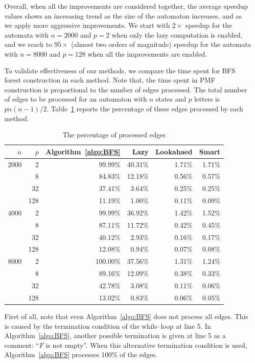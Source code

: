 \documentclass[12pt]{article}
\begin{document}
Overall, when all the improvements are considered together, the average speedup values shows an increasing trend as the size of the automaton increases, and as we apply more aggressive improvements. We start with $2\times$ speedup for the automata with $n=2000$ and $p=2$ when only the lazy computation is enabled, and we reach to $95\times$ (almost two orders of magnitude) speedup for the automata with $n=8000$ and $p=128$ when all the improvements are enabled.

To validate effectiveness of our methods, we compare the time spent for BFS forest construction in each method. Note that, the time spent in PMF construction is proportional to the number of edges processed. The total number of edges to be processed for an automaton with $n$ states and $p$ letters is $pn(n-1)/2$. Table~\ref{table:edge-percent} reports the percentage of these edges processed by each method.

\begin{table}[ht]
	\center
	\begin{tabular}{rr||r||rrr}
$n$		&	$p$	& Algorithm~\ref{algo:BFS} 	& Lazy		& Lookahaed & Smart \\\hline\hline
2000	& 2		& 99.99\%					& 40.31\%	& 1.71\%	& 1.71\%\\
		& 8		& 84.83\%					& 12.18\%	& 0.56\%	& 0.57\%\\
		& 32	& 37.41\%					& 3.64\%	& 0.25\%	& 0.25\%\\
		& 128	& 11.19\%					& 1.00\%	& 0.11\%	& 0.09\%\\\hline
4000	& 2		& 99.99\%					& 36.92\%	& 1.42\%	& 1.52\%\\
		& 8		& 87.11\%					& 11.72\%	& 0.42\%	& 0.45\%\\
		& 32	& 40.12\%					& 2.93\%	& 0.16\%	& 0.17\%\\
		& 128	& 12.08\%					& 0.94\%	& 0.07\%	& 0.08\%\\\hline
8000	& 2		& 100.00\%					& 37.56\%	& 1.31\%	& 1.24\%\\
		& 8		& 89.16\%					& 12.09\%	& 0.38\%	& 0.33\%\\
		& 32	& 42.78\%					& 3.08\%	& 0.11\%	& 0.06\%\\
		& 128	& 13.02\%					& 0.83\%	& 0.06\%	& 0.05\%
	\end{tabular}
	\caption{The percentage of processed edges}
	\label{table:edge-percent}
\end{table}
First of all, note that even Algorithm~\ref{algo:BFS} does not process all edges. This is caused by the termination condition of the while--loop at line 5. In Algorithm~\ref{algo:BFS}, another possible termination is given at line 5 as a comment: ``$F$ is not empty''. When this alternative termination condition is used, Algorithm~\ref{algo:BFS} processes 100\% of the edges. 
\end{document}
